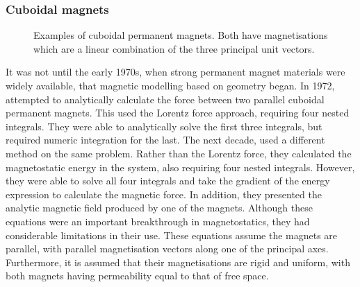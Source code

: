 \subsubsection{Cuboidal magnets}
\begin{figure}
    \centering
    \begin{subfigure}{0.4\textwidth}
        \centering
        
    \end{subfigure}
    \hfill
    \begin{subfigure}{0.4\textwidth}
        \centering
        
    \end{subfigure}
    \caption{Examples of cuboidal permanent magnets. Both have magnetisations which are a linear combination of the three principal unit vectors.}
    \label{fig:cuboidalMagnetsSchematic}
\end{figure}

It was not until the early 1970s, when strong permanent magnet materials were widely available, that magnetic modelling based on geometry began. In 1972, \textcite{Tsui1972} attempted to analytically calculate the force between two parallel cuboidal permanent magnets. This used the Lorentz force approach, requiring four nested integrals. They were able to analytically solve the first three integrals, but required numeric integration for the last. The next decade, \textcite{Akoun1984} used a different method on the same problem. Rather than the Lorentz force, they calculated the magnetostatic energy in the system, also requiring four nested integrals. However, they were able to solve all four integrals and take the gradient of the energy expression to calculate the magnetic force. In addition, they presented the analytic magnetic field produced by one of the magnets. Although these equations were an important breakthrough in magnetostatics, they had considerable limitations in their use. These equations assume the magnets are parallel, with parallel magnetisation vectors along one of the principal axes. Furthermore, it is assumed that their magnetisations are rigid and uniform, with both magnets having permeability equal to that of free space.

